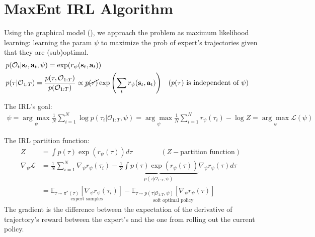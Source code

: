 \section{MaxEnt IRL Algorithm}
Using the graphical model (), we approach the problem as maximum likelihood learning: learning the \ac{param} $\psi$ to maximize the \ac{prob} of expert's trajectories given that they are (sub)optimal.
\begin{align}
	&p(\mathcal{O}_t | \textbf{s}_t, \textbf{a}_t, \psi) = \exp (r_\psi(\textbf{s}_t, \textbf{a}_t))\\
	&p(\tau | \mathcal{O}_{1:T}) = \frac{p(\tau, \mathcal{O}_{1:T})}{p(\mathcal{O}_{1:T})} \propto \cancel{p(\tau)} \exp \left( \sum_{t} r_\psi(\textbf{s}_t, \textbf{a}_t) \right) && (\text{$p(\tau)$ is independent of $\psi$})
\end{align}

The \ac{IRL}'s goal:
\begin{align}
	\psi =  \underset{\psi}{\arg\max} \frac{1}{N} \sum_{i=1}^N \log p(\tau_i | \mathcal{O}_{1:T}, \psi) = \underset{\psi}{\arg\max} \frac{1}{N} \sum_{i=1}^N r_\psi(\tau_i) - \log Z = \underset{\psi}{\arg\max} \mathcal{L}(\psi)
\end{align}

The \ac{IRL} partition function:
\begin{align}
	Z &= \int p(\tau) \exp(r_\psi(\tau)) d\tau \qquad\qquad (Z - \text{partition function})\\
	\nabla_\psi \mathcal{L} &= \frac{1}{N} \sum_{i=1}^N \nabla_\psi r_\psi(\tau_i) - \underbrace{\frac{1}{Z} \int p(\tau) \exp(r_\psi(\tau))}_{\textstyle p(\tau | \mathcal{O}_{1:T}, \psi)} \nabla_\psi r_\psi(\tau) d\tau\\
	&= \underset{\textstyle \text{expert samples}}{\mathbb{E}_{\tau \sim \pi^*(\tau)} [\nabla_\psi r_\psi(\tau_i)]} - \underset{\textstyle \text{soft optimal policy}}{\mathbb{E}_{\tau \sim p(\tau | \mathcal{O}_{1:T}, \psi)} [\nabla_\psi r_\psi(\tau)]} \label{eq:irl-goal}
\end{align}
The gradient is the difference between the expectation of the derivative of trajectory's reward between the expert's and the one from rolling out the current policy.

